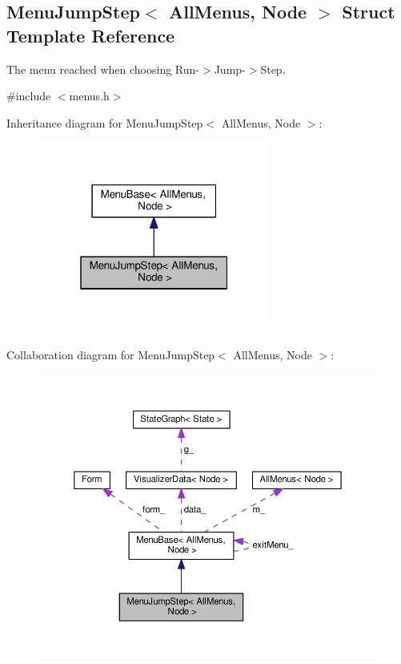 \hypertarget{structMenuJumpStep}{}\subsection{Menu\+Jump\+Step$<$ All\+Menus, Node $>$ Struct Template Reference}
\label{structMenuJumpStep}


The menu reached when choosing Run-\/$>$Jump-\/$>$Step.  




{\ttfamily \#include $<$menus.\+h$>$}



Inheritance diagram for Menu\+Jump\+Step$<$ All\+Menus, Node $>$\+:\nopagebreak
\begin{figure}[H]
\begin{center}
\leavevmode
\includegraphics[width=217pt]{structMenuJumpStep__inherit__graph}
\end{center}
\end{figure}


Collaboration diagram for Menu\+Jump\+Step$<$ All\+Menus, Node $>$\+:\nopagebreak
\begin{figure}[H]
\begin{center}
\leavevmode
\includegraphics[width=350pt]{structMenuJumpStep__coll__graph}
\end{center}
\end{figure}
